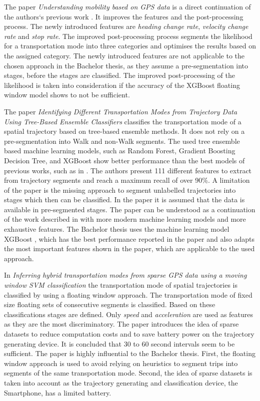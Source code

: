 The paper \textit{Understanding mobility based on GPS data} \cite{zheng2008understanding} is a direct continuation of the authors`s previous work \cite{Zheng2008}. It improves the features and the post-processing process. The newly introduced features are \textit{heading change rate}, \textit{velocity change rate} and \textit{stop rate}. The improved post-processing process segments the likelihood for a transportation mode into three categories and optimises the results based on the assigned category. \newline
The newly introduced features are not applicable to the chosen approach in the Bachelor thesis, as they assume a pre-segmentation into stages, before the stages are classified. The improved post-processing of the likelihood is taken into consideration if the accuracy of the XGBoost floating window model shows to not be sufficient. 

The paper \textit{Identifying Different Transportation Modes from Trajectory Data Using Tree-Based Ensemble Classifiers} \cite{Xiao2017} classifies the transportation mode of a spatial trajectory based on tree-based ensemble methods. It does not rely on a pre-segmentation into Walk and non-Walk segments. The used tree ensemble based machine learning models, such as Random Forest, Gradient Boosting Decision Tree, and XGBoost show better performance than the best models of previous works, such as in \cite{Zheng2008}. The authors present 111 different features to extract from trajectory segments and reach a maximum recall of over 90\%. A limitation of the paper is the missing approach to segment unlabelled trajectories into stages which then can be classified. In the paper it is assumed that the data is available in pre-segmented stages.\newline
The paper can be understood as a continuation of the work described in \cite{Zheng2008} with more modern machine learning models and more exhaustive features. The Bachelor thesis uses the machine learning model XGBoost \cite{chen2016xgboost}, which has the best performance reported in the paper and also adapts the most important features shown in the paper, which are applicable to the used approach.

In \textit{Inferring hybrid transportation modes from sparse GPS data using a moving window SVM classification} \cite{Bolbol2012} the transportation mode of spatial trajectories is classified by using a floating window approach. The transportation mode of fixed size floating sets of consecutive segments is classified. Based on these classifications stages are defined. Only \textit{speed} and \textit{acceleration} are used as features as they are the most discriminatory. The paper introduces the idea of sparse datasets to reduce computation costs and to save battery power on the trajectory generating device. It is concluded that 30 to 60 second intervals seem to be sufficient.\newline
The paper is highly influential to the Bachelor thesis. First, the floating window approach is used to avoid relying on heuristics to segment trips into segments of the same transportation mode. Second, the idea of sparse datasets is taken into account as the trajectory generating and classification device, the Smartphone, has a limited battery. 

